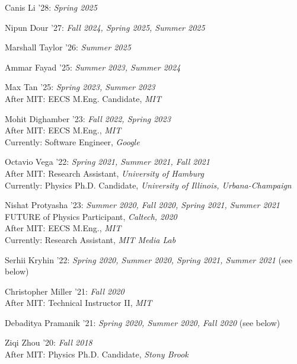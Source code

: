 \bbl

\item Canis Li '28: \emph{Spring 2025}

\item Nipun Dour '27: \emph{Fall 2024, Spring 2025, Summer 2025}

\item Marshall Taylor '26: \emph{Summer 2025}

\item Ammar Fayad '25: \emph{Summer 2023, Summer 2024}

\item Max Tan '25: \emph{Spring 2023, Summer 2023}
\\ After MIT: EECS M.Eng. Candidate, \emph{MIT}

\item Mohit Dighamber '23: \emph{Fall 2022, Spring 2023}
\\ After MIT: EECS M.Eng., \emph{MIT}
\\ Currently: Software Engineer, \emph{Google}

\item Octavio Vega '22: \emph{Spring 2021, Summer 2021, Fall 2021}
\\ After MIT: Research Assistant, \emph{University of Hamburg}
\\ Currently: Physics Ph.D. Candidate, \emph{University of Illinois, Urbana-Champaign}

\item Nishat Protyasha '23: \emph{Summer 2020, Fall 2020, Spring 2021, Summer 2021}
\\ FUTURE of Physics Participant, \emph{Caltech, 2020}
\\ After MIT: EECS M.Eng., \emph{MIT}
\\ Currently: Research Assistant, \emph{MIT Media Lab}

\item Serhii Kryhin '22: \emph{Spring 2020, Summer 2020, Spring 2021, Summer 2021} (see below) 

\item Christopher Miller '21: \emph{Fall 2020}
\\ After MIT: Technical Instructor II, \emph{MIT}

\item Debaditya Pramanik '21: \emph{Spring 2020, Summer 2020, Fall 2020} (see below) 

\item Ziqi Zhou '20: \emph{Fall 2018}
\\ After MIT: Physics Ph.D. Candidate, \emph{Stony Brook}

